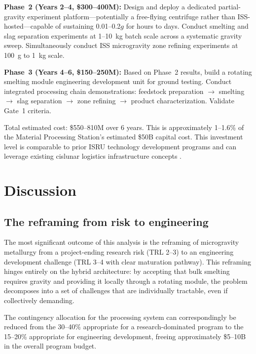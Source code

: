 \documentclass[preprint,12pt]{elsarticle}
\begin{document}
\textbf{Phase~2 (Years 2--4, \$300--400M):} Design and deploy a dedicated partial-gravity experiment platform---potentially a free-flying centrifuge rather than ISS-hosted---capable of sustaining 0.01--0.2$g$ for hours to days. Conduct smelting and slag separation experiments at 1--10~kg batch scale across a systematic gravity sweep. Simultaneously conduct ISS microgravity zone refining experiments at 100~g to 1~kg scale.

\textbf{Phase~3 (Years 4--6, \$150--250M):} Based on Phase~2 results, build a rotating smelting module engineering development unit for ground testing. Conduct integrated processing chain demonstrations: feedstock preparation $\to$ smelting $\to$ slag separation $\to$ zone refining $\to$ product characterization. Validate Gate~1 criteria.

Total estimated cost: \$550--810M over 6 years. This is approximately 1--1.6\% of the Material Processing Station's estimated \$50B capital cost. This investment level is comparable to prior ISRU technology development programs \cite{sanders2013} and can leverage existing cislunar logistics infrastructure concepts \cite{sowers2016}.

\section{Discussion}
\label{sec:discussion}

\subsection{The reframing from risk to engineering}

The most significant outcome of this analysis is the reframing of microgravity metallurgy from a project-ending research risk (TRL 2--3) to an engineering development challenge (TRL 3--4 with clear maturation pathway). This reframing hinges entirely on the hybrid architecture: by accepting that bulk smelting requires gravity and providing it locally through a rotating module, the problem decomposes into a set of challenges that are individually tractable, even if collectively demanding.

The contingency allocation for the processing system can correspondingly be reduced from the 30--40\% appropriate for a research-dominated program to the 15--20\% appropriate for engineering development, freeing approximately \$5--10B in the overall program budget.
\end{document}
